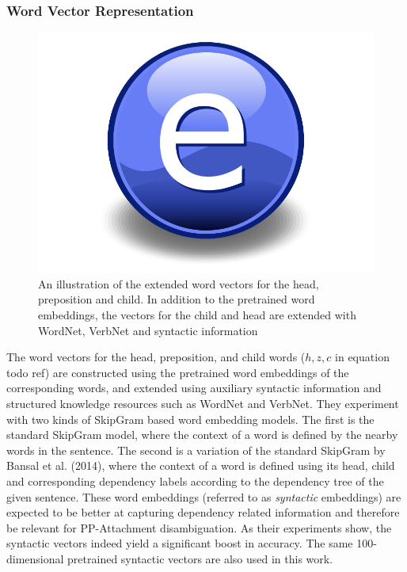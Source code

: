 \subsubsection{Word Vector Representation}

\begin{figure}
    \centering
    \includegraphics{Figures/Electron.pdf}
    \caption{An illustration of the extended word vectors for the head, preposition and child. In addition to the pretrained word embeddings, the vectors for the child and head are extended with WordNet, VerbNet and syntactic information}
    \label{fig:hpcdvectors}
\end{figure}

The word vectors for the head, preposition, and child words ($h, z, c$ in equation todo ref) are constructed using the pretrained word embeddings of the corresponding words, and extended using auxiliary syntactic information and structured knowledge resources such as WordNet and VerbNet. They experiment with two kinds of SkipGram based word embedding models. The first is the standard SkipGram model, where the context of a word is defined by the nearby words in the sentence. The second is a variation of the standard SkipGram by Bansal et al. (2014), where the context of a word is defined using its head, child and corresponding dependency labels according to the dependency tree of the given sentence. These word embeddings (referred to as \textit{syntactic} embeddings) are expected to be better at capturing dependency related information and therefore be relevant for PP-Attachment disambiguation. As their experiments show, the syntactic vectors indeed yield a significant boost in accuracy. The same 100-dimensional pretrained syntactic vectors are also used in this work. 

